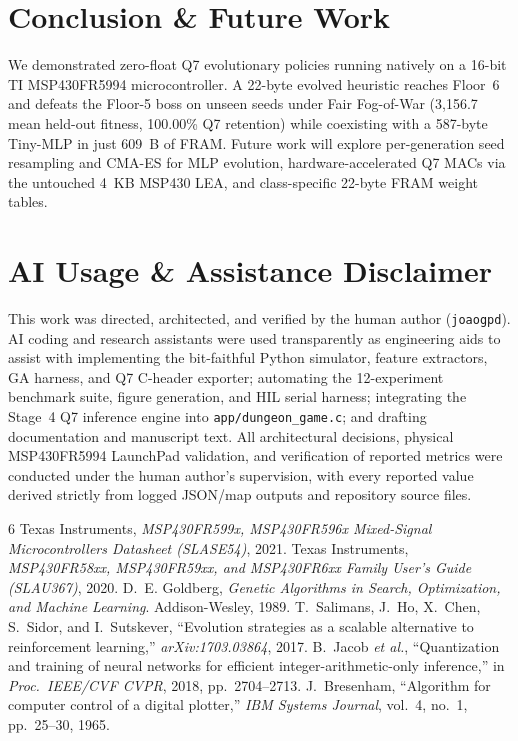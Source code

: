 \documentclass[conference]{IEEEtran}
\begin{document}
\section{Conclusion \& Future Work}
We demonstrated zero-float Q7 evolutionary policies running natively on a 16-bit TI MSP430FR5994 microcontroller. A 22-byte evolved heuristic reaches Floor~6 and defeats the Floor-5 boss on unseen seeds under Fair Fog-of-War (3,156.7 mean held-out fitness, 100.00\% Q7 retention) while coexisting with a 587-byte Tiny-MLP in just 609~B of FRAM. Future work will explore per-generation seed resampling and CMA-ES for MLP evolution, hardware-accelerated Q7 MACs via the untouched 4~KB MSP430 LEA, and class-specific 22-byte FRAM weight tables.

\section*{AI Usage \& Assistance Disclaimer}
This work was directed, architected, and verified by the human author (\texttt{joaogpd}). AI coding and research assistants were used transparently as engineering aids to assist with implementing the bit-faithful Python simulator, feature extractors, GA harness, and Q7 C-header exporter; automating the 12-experiment benchmark suite, figure generation, and HIL serial harness; integrating the Stage~4 Q7 inference engine into \texttt{app/dungeon\_game.c}; and drafting documentation and manuscript text. All architectural decisions, physical MSP430FR5994 LaunchPad validation, and verification of reported metrics were conducted under the human author's supervision, with every reported value derived strictly from logged JSON/map outputs and repository source files.

\begin{thebibliography}{6}
 Texas Instruments, \emph{MSP430FR599x, MSP430FR596x Mixed-Signal Microcontrollers Datasheet (SLASE54)}, 2021.
 Texas Instruments, \emph{MSP430FR58xx, MSP430FR59xx, and MSP430FR6xx Family User's Guide (SLAU367)}, 2020.
 D.~E. Goldberg, \emph{Genetic Algorithms in Search, Optimization, and Machine Learning}. Addison-Wesley, 1989.
 T.~Salimans, J.~Ho, X.~Chen, S.~Sidor, and I.~Sutskever, ``Evolution strategies as a scalable alternative to reinforcement learning,'' \emph{arXiv:1703.03864}, 2017.
 B.~Jacob \emph{et al.}, ``Quantization and training of neural networks for efficient integer-arithmetic-only inference,'' in \emph{Proc.\ IEEE/CVF CVPR}, 2018, pp.~2704--2713.
 J.~Bresenham, ``Algorithm for computer control of a digital plotter,'' \emph{IBM Systems Journal}, vol.~4, no.~1, pp.~25--30, 1965.
\end{thebibliography}
\end{document}
